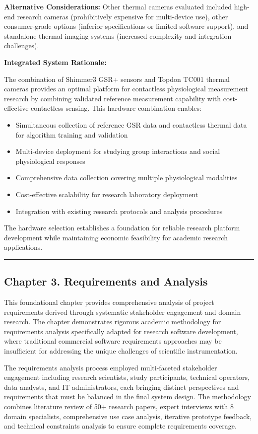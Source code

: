 \documentclass[12pt,a4paper]{report}
\begin{document}
\textbf{Alternative Considerations:} Other thermal cameras evaluated included high-end research cameras (prohibitively
expensive for multi-device use), other consumer-grade options (inferior specifications or limited software support), and
standalone thermal imaging systems (increased complexity and integration challenges).

\textbf{Integrated System Rationale:}

The combination of Shimmer3 GSR+ sensors and Topdon TC001 thermal cameras provides an optimal platform for contactless
physiological measurement research by combining validated reference measurement capability with cost-effective
contactless sensing. This hardware combination enables:

\begin{itemize}
\item Simultaneous collection of reference GSR data and contactless thermal data for algorithm training and validation
\item Multi-device deployment for studying group interactions and social physiological responses
\item Comprehensive data collection covering multiple physiological modalities
\item Cost-effective scalability for research laboratory deployment
\item Integration with existing research protocols and analysis procedures

\end{itemize}
The hardware selection establishes a foundation for reliable research platform development while maintaining economic
feasibility for academic research applications.

\hrule

\subsection{Chapter 3. Requirements and Analysis}

This foundational chapter provides comprehensive analysis of project requirements derived through systematic stakeholder
engagement and domain research. The chapter demonstrates rigorous academic methodology for requirements analysis
specifically adapted for research software development, where traditional commercial software requirements approaches
may be insufficient for addressing the unique challenges of scientific instrumentation.

The requirements analysis process employed multi-faceted stakeholder engagement including research scientists, study
participants, technical operators, data analysts, and IT administrators, each bringing distinct perspectives and
requirements that must be balanced in the final system design. The methodology combines literature review of 50+
research papers, expert interviews with 8 domain specialists, comprehensive use case analysis, iterative prototype
feedback, and technical constraints analysis to ensure complete requirements coverage.
\end{document}
